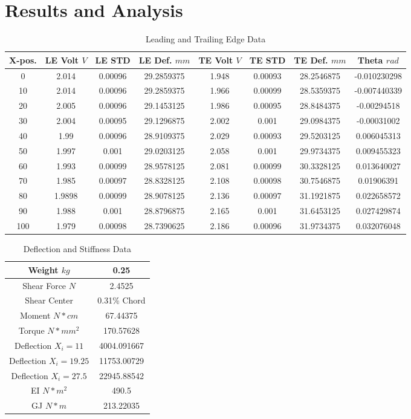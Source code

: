 \documentclass{article}
\begin{document}
\section{Results and Analysis}

\begin{table}[hbtp]
  \centering
  \begin{tabular}{|c|c|c|c|c|c|c|c|}
  \hline
  X-pos. & LE Volt \(V\) & LE STD & LE Def. \(mm\) & TE Volt \(V\) & TE STD & TE Def. \(mm\) & Theta \(rad\) \\
  \hline
  0 & 2.014 & 0.00096 & 29.2859375 & 1.948 & 0.00093 & 28.2546875 & -0.010230298 \\
  10 & 2.014 & 0.00096 & 29.2859375 & 1.966 & 0.00099 & 28.5359375 & -0.007440339 \\
  20 & 2.005 & 0.00096 & 29.1453125 & 1.986 & 0.00095 & 28.8484375 & -0.00294518 \\
  30 & 2.004 & 0.00095 & 29.1296875 & 2.002 & 0.001 & 29.0984375 & -0.00031002 \\
  40 & 1.99 & 0.00096 & 28.9109375 & 2.029 & 0.00093 & 29.5203125 & 0.006045313 \\
  50 & 1.997 & 0.001 & 29.0203125 & 2.058 & 0.001 & 29.9734375 & 0.009455323 \\
  60 & 1.993 & 0.00099 & 28.9578125 & 2.081 & 0.00099 & 30.3328125 & 0.013640027 \\
  70 & 1.985 & 0.00097 & 28.8328125 & 2.108 & 0.00098 & 30.7546875 & 0.01906391 \\
  80 & 1.9898 & 0.00099 & 28.9078125 & 2.136 & 0.00097 & 31.1921875 & 0.022658572 \\
  90 & 1.988 & 0.001 & 28.8796875 & 2.165 & 0.001 & 31.6453125 & 0.027429874 \\
  100 & 1.979 & 0.00098 & 28.7390625 & 2.186 & 0.00096 & 31.9734375 & 0.032076048 \\
  \hline
  \end{tabular}
  \caption{Leading and Trailing Edge Data}
  \label{tab:LE_TE_Data}
\end{table}
  
\begin{table}[hbtp]
  \centering
  \begin{tabular}{|c|c|}
  \hline
  Weight \(kg\) & 0.25 \\
  \hline
  Shear Force \(N\) & 2.4525 \\
  \hline
  Shear Center & 0.31\% Chord \\
  \hline
  Moment \(N*cm\) & 67.44375 \\
  \hline
  Torque \(N*mm^2\) & 170.57628 \\
  \hline
  Deflection \(X_i=11\) & 4004.091667 \\
  \hline
  Deflection \(X_i=19.25\) & 11753.00729 \\
  \hline
  Deflection \(X_i=27.5\) & 22945.88542 \\
  \hline
  EI \(N*m^2\) & 490.5 \\
  \hline
  GJ \(N*m\) & 213.22035 \\
  \hline
  \end{tabular}
  \caption{Deflection and Stiffness Data}
  \label{tab:deflect_stiff}
\end{table}
\end{document}
